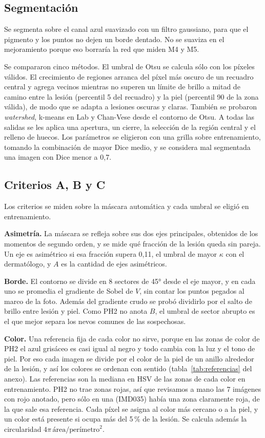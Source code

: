 \subsection{Segmentación}
\label{sec:segmentacion}
Se segmenta sobre el canal azul suavizado con un filtro gaussiano, para que el pigmento y los puntos no dejen un borde dentado. No se suaviza en el mejoramiento porque eso borraría la red que miden M4 y M5.

Se compararon cinco métodos. El umbral de Otsu \parencite{otsu1979} se calcula sólo con los píxeles válidos. El crecimiento de regiones arranca del píxel más oscuro de un recuadro central y agrega vecinos mientras no superen un límite de brillo a mitad de camino entre la lesión (percentil 5 del recuadro) y la piel (percentil 90 de la zona válida), de modo que se adapta a lesiones oscuras y claras. También se probaron \emph{watershed}, k-means en Lab y Chan-Vese \parencite{chan2001} desde el contorno de Otsu. A todas las salidas se les aplica una apertura, un cierre, la selección de la región central y el relleno de huecos. Los parámetros se eligieron con una grilla sobre entrenamiento, tomando la combinación de mayor Dice medio, y se considera mal segmentada una imagen con Dice menor a 0,7.

\subsection{Criterios A, B y C}
\label{sec:abc}
Los criterios se miden sobre la máscara automática y cada umbral se eligió en entrenamiento.

\textbf{Asimetría.} La máscara se refleja sobre sus dos ejes principales, obtenidos de los momentos de segundo orden, y se mide qué fracción de la lesión queda sin pareja. Un eje es asimétrico si esa fracción supera 0,11, el umbral de mayor $\kappa$ con el dermatólogo, y $A$ es la cantidad de ejes asimétricos.

\textbf{Borde.} El contorno se divide en 8 sectores de 45° desde el eje mayor, y en cada uno se promedia el gradiente de Sobel de $V$, sin contar los puntos pegados al marco de la foto. Además del gradiente crudo se probó dividirlo por el salto de brillo entre lesión y piel. Como PH2 no anota $B$, el umbral de sector abrupto es el que mejor separa los nevos comunes de las sospechosas.

\textbf{Color.} Una referencia fija de cada color no sirve, porque en las zonas de color de PH2 el azul grisáceo es casi igual al negro y todo cambia con la luz y el tono de piel. Por eso cada imagen se divide por el color de la piel de un anillo alrededor de la lesión, y así los colores se ordenan con sentido (tabla~\ref{tab:referencias} del anexo). Las referencias son la mediana en HSV de las zonas de cada color en entrenamiento. PH2 no trae zonas rojas, así que revisamos a mano las 7 imágenes con rojo anotado, pero sólo en una (IMD035) había una zona claramente roja, de la que sale esa referencia. Cada píxel se asigna al color más cercano o a la piel, y un color está presente si ocupa más del 5\,\% de la lesión. Se calcula además la circularidad $4\pi\,\text{área}/\text{perímetro}^2$.


